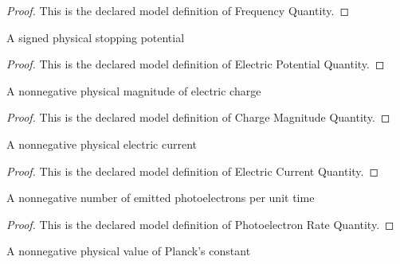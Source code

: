 \begin{proof}
  This is the declared model definition of Frequency Quantity.
\end{proof}
\begin{definition}
  \label{def:physics:phyx-mini-0498:phyxminiproblems-problemphyxmini0498-electricpotentialquantity}
  A signed physical stopping potential
\end{definition}
\begin{proof}
  This is the declared model definition of Electric Potential Quantity.
\end{proof}
\begin{definition}
  \label{def:physics:phyx-mini-0498:phyxminiproblems-problemphyxmini0498-chargemagnitudequantity}
  A nonnegative physical magnitude of electric charge
\end{definition}
\begin{proof}
  This is the declared model definition of Charge Magnitude Quantity.
\end{proof}
\begin{definition}
  \label{def:physics:phyx-mini-0498:phyxminiproblems-problemphyxmini0498-electriccurrentquantity}
  A nonnegative physical electric current
\end{definition}
\begin{proof}
  This is the declared model definition of Electric Current Quantity.
\end{proof}
\begin{definition}
  \label{def:physics:phyx-mini-0498:phyxminiproblems-problemphyxmini0498-photoelectronratequantity}
  A nonnegative number of emitted photoelectrons per unit time
\end{definition}
\begin{proof}
  This is the declared model definition of Photoelectron Rate Quantity.
\end{proof}
\begin{definition}
  \label{def:physics:phyx-mini-0498:phyxminiproblems-problemphyxmini0498-planckconstantquantity}
  A nonnegative physical value of Planck's constant
\end{definition}
